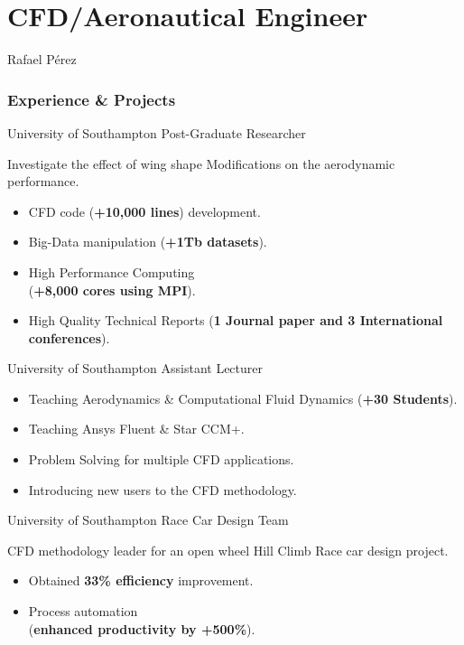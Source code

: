 \documentclass[fontsize=10pt]{tccv}
\begin{document}
\part{CFD/Aeronautical Engineer}{Rafael P\'erez}

\section{Experience \& Projects}
\begin{eventlist}
     {University of Southampton}
     {Post-Graduate Researcher}

Investigate the effect of wing shape Modifications on
the aerodynamic performance.
\begin{itemize}
	\itemsep -1pt
	\item CFD code (\textbf{+10,000 lines}) development.
	\item Big-Data manipulation (\textbf{+1Tb datasets}).
	\item High Performance Computing\\ (\textbf{+8,000 cores using MPI}).
	\item High Quality Technical Reports (\textbf{1 Journal paper and 3 International
	conferences}).
\end{itemize}

	{University of Southampton}
	{Assistant Lecturer}
\begin{itemize}
	\itemsep -1pt
	\item Teaching Aerodynamics \& Computational Fluid Dynamics (\textbf{+30 Students}).
	\item Teaching Ansys Fluent \& Star CCM+.
	\item Problem Solving for multiple CFD applications.
	\item Introducing new users to the CFD methodology.
\end{itemize}

     {University of Southampton}
     {Race Car Design Team}

CFD methodology leader for an open wheel Hill Climb Race car design project.
     \begin{itemize}
	\itemsep -1pt
     	\item Obtained \textbf{33\% efficiency} improvement.
     	\item Process automation \\(\textbf{enhanced productivity by +500\%}).
     \end{itemize}


\end{eventlist}
\end{document}
